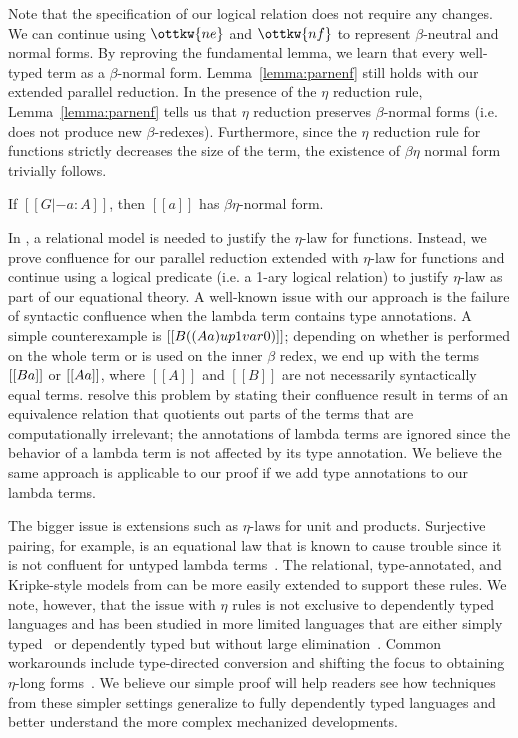 \documentclass[acmsmall,screen=true,
\ifpublic review=false\else,review=true\fi
  ,anonymous=\ifanonymous true\else false\fi]{acmart}
\begin{document}
Note that the specification of our logical relation does not require
any changes. We can continue using $\ottkw{ne}$ and $\ottkw{nf}$ to
represent $\beta$-neutral and normal forms. By reproving the
fundamental lemma, we learn that every well-typed term as a
$\beta$-normal form. Lemma~\ref{lemma:parnenf} still holds with our
extended parallel reduction. In the presence of the $\eta$ reduction
rule, Lemma~\ref{lemma:parnenf} tells us that $\eta$ reduction
preserves $\beta$-normal forms (i.e. does not produce new
$\beta$-redexes). Furthermore, since the $\eta$ reduction rule for
functions strictly decreases the size of the term, the existence of
$\beta\eta$ normal form trivially follows.
\begin{corollary}
\label{corollary:exbetaeta}
If $[[G |- a : A]]$, then $[[a]]$ has $\beta\eta$-normal form.
\end{corollary}

In \citet{nbeincoq,decagda,martin-lof-a-la-coq}, a relational model is
needed to justify the $\eta$-law for functions. Instead, we prove
confluence for our parallel reduction extended with $\eta$-law for functions
and continue using a logical predicate (i.e. a 1-ary logical relation) to justify
$\eta$-law as part of our equational theory.
A well-known issue with our approach is the failure of syntactic
confluence when the lambda term contains type annotations. A simple
counterexample is $[[\- B ((\- A a) {up 1} var 0)]]$; depending on
whether  is performed on the whole term or
 is used on the inner $\beta$ redex, we end up with the
terms $[[\- B a]]$ or $[[\- A a]]$, where $[[A]]$ and $[[B]]$ are not
necessarily syntactically equal terms. \citet{choudhury:ddc} resolve
this problem by stating their confluence result in terms of an
equivalence relation that quotients out parts of the terms that are
computationally irrelevant; the annotations of lambda terms are
ignored since the behavior of a lambda term is not affected by its
type annotation. We believe the same approach is applicable to our
proof if we add type annotations to our lambda terms.

The bigger issue is extensions such as $\eta$-laws for unit and
products. Surjective pairing, for example, is an equational law that
is known to cause trouble since it is not confluent for untyped lambda
terms~\citet{KLOP198997}. The relational, type-annotated, and Kripke-style models from
\citet{nbeincoq,decagda,martin-lof-a-la-coq} can be more easily
extended to support these rules.
We note, however, that the issue with $\eta$ rules is not exclusive to dependently
typed languages and has been studied in more limited languages that
are either simply
typed~\citep{pierce2004advanced,pfenning1997computation} or
dependently typed but without large
elimination~\citep{harper2005equivalence,
abel2005untypedconvsurjective}. Common workarounds include
type-directed conversion and shifting the focus to obtaining
$\eta$-long forms~\citet{Abel12}.
We believe our simple proof will help readers
see how techniques from these simpler settings generalize to fully
dependently typed languages and better understand the more complex
mechanized developments.
\end{document}
